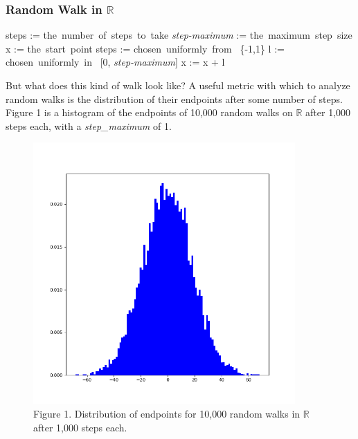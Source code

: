 \documentclass{article}
\begin{document}
  \vspace{0.4cm}
  \subsubsection*{Random Walk in $\mathbb{R}$}

\begin{adjustwidth}{1cm}{}\begin{programbox}
steps := \mbox{the number of steps to take}
\textit{step-maximum} := \mbox{the maximum step size}
x \in \R := \mbox{the start point}
 \TO steps \DO
  \vec{\theta} := \mbox{chosen uniformly from } \{-1,1\}
  l := \mbox{chosen uniformly in } [0, \textit{step-maximum}]
  x := x + l \vec{\theta}
\OD
\end{programbox}\end{adjustwidth}
 \vspace{0.6cm}


  But what does this kind of walk look like? A useful metric with which to analyze random walks is the distribution of their endpoints after some number of steps. Figure 1 is a histogram of the endpoints of 10,000 random walks on $  \mathbb{R}  $ after 1,000 steps each, with a \textit{step_maximum} of 1.



\begin{figure}[h]
\centering
\includegraphics[width=10cm,keepaspectratio]{images/walk1d-hist.png}
\captionsetup{labelformat=empty} \caption{Figure 1. Distribution of endpoints for 10,000 random walks in $\mathbb{R}$ after 1,000 steps each.}
\end{figure}
\end{document}
